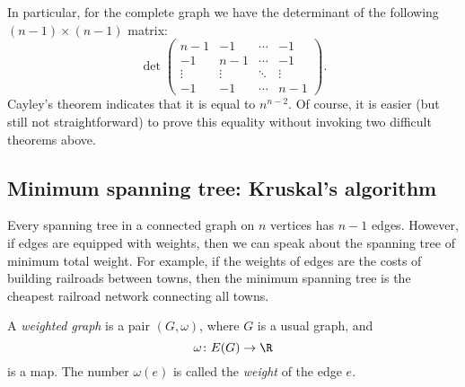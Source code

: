 \begin{page}
\setcounter{section}{2}
\setcounter{subsection}{6}
\setcounter{dfn}{15}
\label{portion:257}


In particular, for the complete graph we have the determinant of the following $(n-1) \times (n-1)$ matrix:
\[
\det
\begin{pmatrix}
n-1 & -1 & \cdots & -1\\
-1 & n-1 & \cdots & -1\\
\vdots & \vdots & \ddots & \vdots\\
-1 & -1 & \cdots & n-1
\end{pmatrix}.
\]
Cayley's theorem indicates that it is equal to $n^{n-2}$.
Of course, it is easier (but still not straightforward) to prove this equality without invoking two difficult theorems above.




\end{page}

\begin{page}
\setcounter{section}{2}
\setcounter{subsection}{6}
\setcounter{dfn}{15}
\label{portion:258}

\subsection{Minimum spanning tree: Kruskal's algorithm}
Every spanning tree in a connected graph on $n$ vertices has $n-1$ edges.
However, if edges are equipped with weights, then we can speak about the spanning tree of minimum total weight.
For example, if the weights of edges are the costs of building railroads between towns,
then the minimum spanning tree is the cheapest railroad network connecting all towns.


\end{page}

\begin{page}
\setcounter{section}{2}
\setcounter{subsection}{6}
\setcounter{dfn}{16}
\label{portion:260}

\begin{dfn}
A \emph{weighted graph} is a pair $(G, \omega)$, where $G$ is a usual graph, and
\[
\omega \colon E(G) \to \R
\]
is a map. The number $\omega(e)$ is called the \emph{weight} of the edge $e$.
\end{dfn}

\end{page}

